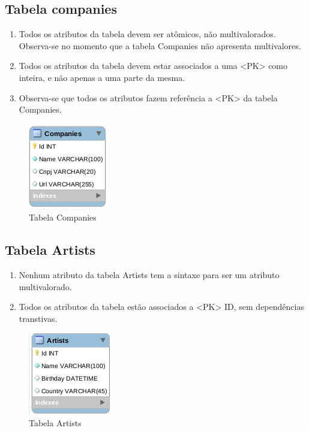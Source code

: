 \documentclass[a4paper,10pt]{article}
\begin{document}
\subsection{Tabela companies}

\begin{enumerate}
	\item Todos os atributos da tabela devem ser atômicos, não multivalorados.\\Observa-se no momento que a tabela Companies não apresenta multivalores.
	\item Todos os atributos da tabela devem estar associados a uma <PK> como inteira, e não apenas a uma parte da mesma.
	\item Observa-se que todos os atributos fazem referência a <PK> da tabela Companies.
\end{enumerate}

\begin{figure}%
\includegraphics[width=.4\columnwidth]{normalizacao/companies}%
\caption{Tabela Companies}%
\end{figure}

							

\subsection{Tabela Artists}

\begin{enumerate}
	\item Nenhum atributo da tabela Artists tem a sintaxe para ser um atributo multivalorado.
	\item Todos os atributos da tabela estão associados a <PK> ID, sem dependências transtivas.
\end{enumerate}

\begin{figure}%
\includegraphics[width=.4\columnwidth]{normalizacao/artists}%
\caption{Tabela Artists}%
\end{figure}
\end{document}
